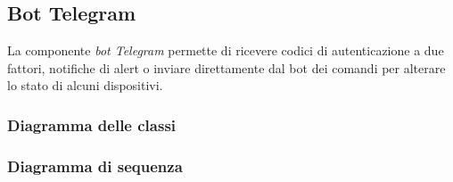 \subsection{Bot Telegram}
	La componente \textit{bot Telegram} permette di ricevere codici di autenticazione a due fattori, notifiche di alert o inviare direttamente dal bot dei comandi per alterare lo stato di alcuni dispositivi. 
\subsubsection{Diagramma delle classi}
\subsubsection{Diagramma di sequenza}